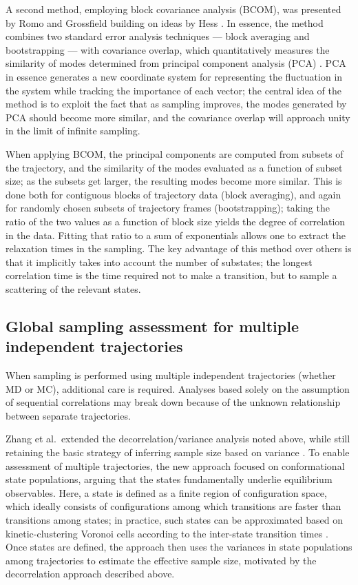 A second method, employing block covariance analysis (BCOM), was presented by Romo and Grossfield \cite{Romo2011} building on ideas by Hess \cite{Hess2002}.  In essence, the method combines two standard error analysis techniques --- block averaging \cite{Flyvbjerg-1989} and bootstrapping \cite{Tibshirani1998} --- with covariance overlap, which quantitatively measures the similarity of modes determined from principal component analysis (PCA) \cite{Hess2002}.  PCA in essence generates a new coordinate system for representing the fluctuation in the system while tracking the importance of each vector; the central idea of the method is to exploit the fact that as sampling improves, the modes generated by PCA should become more similar, and the covariance overlap will approach unity in the limit of infinite sampling.

When applying BCOM, the principal components are computed from subsets of the trajectory, and the similarity of the modes evaluated as a function of subset size; as the subsets get larger, the resulting modes become more similar.  This is done both for contiguous blocks of trajectory data (block averaging), and again for randomly chosen subsets of trajectory frames (bootstrapping); taking the ratio of the two values as a function of block size yields the degree of correlation in the data.  Fitting that ratio to a sum of exponentials allows one to extract the relaxation times in the sampling.  The key advantage of this method over others is that it implicitly takes into account the number of substates; the longest correlation time is the time required not to make a transition, but to sample a scattering of the relevant states. 

\subsection{Global sampling assessment for multiple independent trajectories}
\label{sec:globalMultiTraj}
When sampling is performed using multiple independent trajectories (whether MD or MC), additional care is required.
Analyses based solely on the assumption of sequential correlations may break down because of the unknown relationship between separate trajectories.

Zhang et al.\ extended the decorrelation/variance analysis noted above, while still retaining the basic strategy of inferring sample size based on variance \cite{Zhang2010}.
To enable assessment of multiple trajectories, the new approach focused on conformational state populations, arguing that the states fundamentally underlie equilibrium observables.
Here, a state is defined as a finite region of configuration space, which ideally consists of configurations among which transitions are faster than transitions among states; 
in practice, such states can be approximated based on kinetic-clustering Voronoi cells according to the inter-state transition times \cite{Zhang2010}.
Once states are defined, the approach then uses the variances in state populations among trajectories to estimate the effective sample size, motivated by the decorrelation approach \cite{Lyman2007a} described above.

